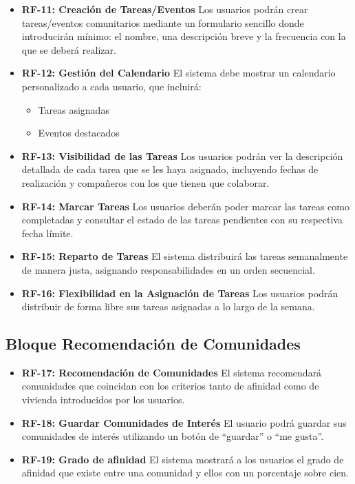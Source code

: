 \begin{itemize}
    \item \textbf{RF-11: Creación de Tareas/Eventos}  
    Los usuarios podrán crear tareas/eventos comunitarios mediante un formulario sencillo donde introducirán mínimo: el nombre, una descripción breve y la frecuencia con la que se deberá realizar.
    
    \item \textbf{RF-12: Gestión del Calendario}  
    El sistema debe mostrar un calendario personalizado a cada usuario, que incluirá:
    \begin{itemize}
        \item Tareas asignadas
        \item Eventos destacados
    \end{itemize}
    
    \item \textbf{RF-13: Visibilidad de las Tareas}  
    Los usuarios podrán ver la descripción detallada de cada tarea que se les haya asignado, incluyendo fechas de realización y compañeros con los que tienen que colaborar.
    
    \item \textbf{RF-14: Marcar Tareas}  
    Los usuarios deberán poder marcar las tareas como completadas y consultar el estado de las tareas pendientes con su respectiva fecha límite.

    \item \textbf{RF-15: Reparto de Tareas}  
    El sistema distribuirá las tareas semanalmente de manera justa, asignando responsabilidades en un orden secuencial.

    \item \textbf{RF-16: Flexibilidad en la Asignación de Tareas}  
    Los usuarios podrán distribuir de forma libre sus tareas asignadas a lo largo de la semana.
\end{itemize}

\subsection{Bloque Recomendación de Comunidades}

\begin{itemize}
    \item \textbf{RF-17: Recomendación de Comunidades}  
    El sistema recomendará comunidades que coincidan con los criterios tanto de afinidad como de vivienda introducidos por los usuarios.
    
    \item \textbf{RF-18: Guardar Comunidades de Interés}  
    El usuario podrá guardar sus comunidades de interés utilizando un botón de “guardar” o “me gusta”.
    
    \item \textbf{RF-19: Grado de afinidad}  
    El sistema mostrará a los usuarios el grado de afinidad que existe entre una comunidad y ellos con un porcentaje sobre cien.
\end{itemize}

